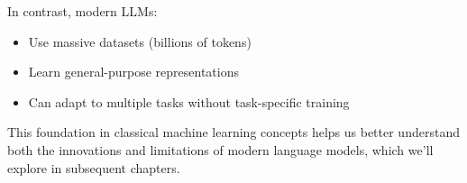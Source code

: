 In contrast, modern LLMs:
\begin{itemize}[noitemsep]
    \item Use massive datasets (billions of tokens)
    \item Learn general-purpose representations
    \item Can adapt to multiple tasks without task-specific training
\end{itemize}

This foundation in classical machine learning concepts helps us better understand both the innovations and limitations of modern language models, which we'll explore in subsequent chapters. 